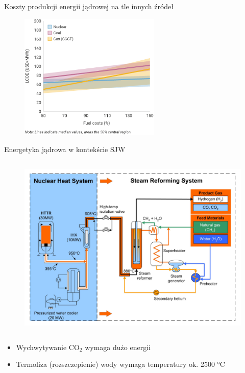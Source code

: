 \begin{frame}{Koszty produkcji energii jądrowej na tle innych źródeł}
    \begin{figure}
        \centering
        \includegraphics[width=0.6\textwidth, frame]{images/price_of_nuclear.png}
    \end{figure}
\end{frame}


\begin{columnframe}{Energetyka jądrowa w kontekście SJW}
    \begin{column}{0.6\textwidth}
        \begin{figure}
            \centering
            \includegraphics[width=1.0\textwidth, frame]{images/nuclear_thermolysis.png}
        \end{figure}
    \end{column}
    \begin{column}{0.4\textwidth}
        \begin{itemize}
            \item Wychwytywanie CO$_2$ wymaga dużo energii
            \item Termoliza (rozszczepienie) wody wymaga temperatury ok. 2500 \si{\degreeCelsius}
        \end{itemize}
    \end{column}
\end{columnframe}

